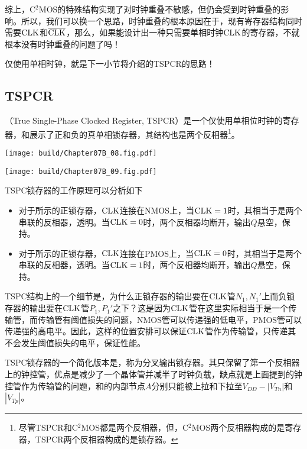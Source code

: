 综上，C$^2$MOS的特殊结构实现了对时钟重叠不敏感，但仍会受到时钟重叠的影响。所以，我们可以换一个思路，时钟重叠的根本原因在于，现有寄存器结构同时需要$\CLK$和$\CLK*$，那么，如果能设计出一种只需要单相时钟$\CLK$的寄存器，不就根本没有时钟重叠的问题了吗！

仅使用单相时钟，就是下一小节将介绍的TSPCR的思路！

\subsection{TSPCR}
（True Single-Phase Clocked Register, TSPCR）是一个仅使用单相位时钟的寄存器，和展示了正和负的真单相锁存器，其结构也是两个反相器\footnote{尽管TSPCR和C$^2$MOS都是两个反相器，但，C$^2$MOS两个反相器构成的是寄存器，TSPCR两个反相器构成的是锁存器。}。

\begin{Figure}[真单相锁存器]
    \begin{FigureSub}[正真单相锁存器]
        \texttt{[image: build/Chapter07B\_08.fig.pdf]}
    \end{FigureSub}
    \hspace{0.25cm}
    \begin{FigureSub}[负真单相锁存器]
        \texttt{[image: build/Chapter07B\_09.fig.pdf]}
    \end{FigureSub}
\end{Figure}\goodbreak

TSPC锁存器的工作原理可以分析如下
\begin{itemize}
    \item 对于所示的正锁存器，$\CLK$连接在NMOS上，当$\CLK=1$时，其相当于是两个串联的反相器，透明。当$\CLK=0$时，两个反相器均断开，输出$Q$悬空，保持。
    \item 对于所示的正锁存器，$\CLK$连接在PMOS上，当$\CLK=0$时，其相当于是两个串联的反相器，透明。当$\CLK=1$时，两个反相器均断开，输出$Q$悬空，保持。
\end{itemize}
TSPC结构上的一个细节是，为什么正锁存器的输出要在$\CLK$管$N_1,N_1'$上而负锁存器的输出要在$\CLK$管$P_1,P_1'$之下？这是因为$\CLK$管在这里实际相当于是一个传输管，而传输管有阈值损失的问题，NMOS管可以传递强的低电平，PMOS管可以传递强的高电平。因此，这样的位置安排可以保证$\CLK$管作为传输管，只传递其不会发生阈值损失的电平，保证性能。

TSPC锁存器的一个简化版本是，称为分叉输出锁存器。其只保留了第一个反相器上的钟控管，优点是减少了一个晶体管并减半了时钟负载，缺点就是上面提到的钟控管作为传输管的问题，和的内部节点$A$分别只能被上拉和下拉至$V_{DD}-|V_{Tn}|$和$|V_{Tp}|$。

